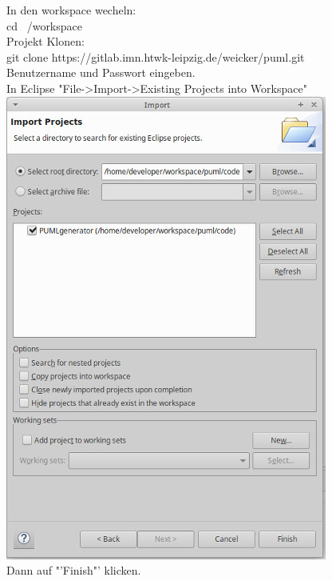 In den workspace wecheln:\\
cd ~/workspace\\
Projekt Klonen:\\
git clone https://gitlab.imn.htwk-leipzig.de/weicker/puml.git\\
Benutzername und Passwort eingeben.\\
In Eclipse "File->Import->Existing Projects into Workspace"\\
\includegraphics[scale=0.25]{Bilder/importProject}\\
Dann auf "'Finish"' klicken.
\nsecend

